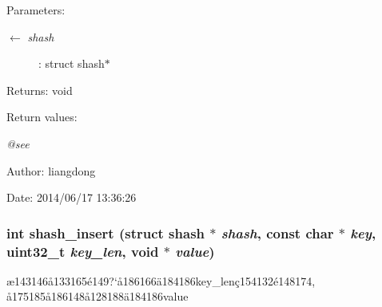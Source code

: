 \begin{Desc}
\item[Parameters:]
\begin{description}
\item[\mbox{$\leftarrow$} {\em shash}]: struct shash$\ast$ \end{description}
\end{Desc}
\begin{Desc}
\item[Returns:]void \end{Desc}
\begin{Desc}
\item[Return values:]
\begin{description}
\item[{\em @see}]\end{description}
\end{Desc}
\begin{Desc}
\item[Author:]liangdong \end{Desc}
\begin{Desc}
\item[Date:]2014/06/17 13:36:26 \end{Desc}
\subsubsection{\setlength{\rightskip}{0pt plus 5cm}int shash\_\-insert (struct shash $\ast$ {\em shash}, const char $\ast$ {\em key}, uint32\_\-t {\em key\_\-len}, void $\ast$ {\em value})}\label{shash_8c_a7}


\ae{}143146\aa{}133165\'{e}149?`\aa{}186166\"{a}184186key\_\-len\c{c}154132\'{e}148174, \aa{}175185\aa{}186148\aa{}128188\"{a}184186value 

